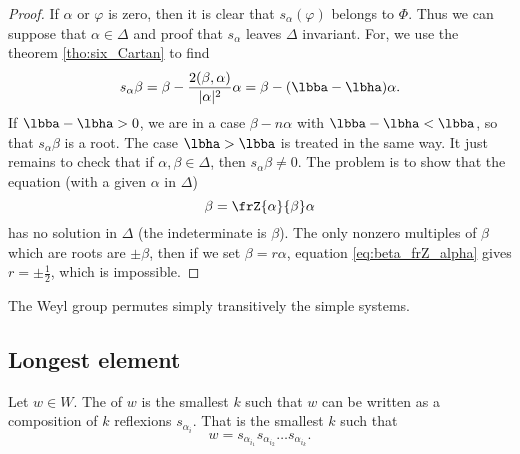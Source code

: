 \begin{proof}
If $\alpha$ or $\varphi$ is zero, then it is clear that $s_{\alpha}(\varphi)$ belongs to $\Phi$. Thus we can suppose that $\alpha\in\Delta$ and proof that $s_{\alpha}$ leaves $\Delta$ invariant. For, we use the theorem \ref{tho:six_Cartan} to find
\begin{equation}
  s_{\alpha}\beta=\beta-\frac{2(\beta,\alpha)}{|\alpha|^2}\alpha
               =\beta-(\lbba-\lbha)\alpha.
\end{equation}
If $\lbba-\lbha>0$, we are in a case $\beta-n\alpha$ with $\lbba-\lbha<\lbba$, so that $s_{\alpha}\beta$ is a root. The case $\lbha>\lbba$ is treated in the same way. It just remains to check that  if $\alpha,\beta\in\Delta$, then $s_{\alpha}\beta\neq0$. The problem is to show that the equation (with a given $\alpha$ in $\Delta$)
\begin{equation}\label{eq:beta_frZ_alpha}
   \beta=\frZ{\alpha}{\beta}\alpha
\end{equation}
has no solution in $\Delta$ (the indeterminate is $\beta$). The only nonzero multiples of $\beta$ which are roots are $\pm\beta$, then if we set $\beta=r\alpha$, equation \eqref{eq:beta_frZ_alpha} gives $r=\pm\frac{1}{2}$, which is impossible.

\end{proof}

\begin{proposition}
    The Weyl group permutes simply transitively the simple systems.
\end{proposition}



\subsection{Longest element}

Let \( w\in W\). The  of \( w\) is the smallest \( k\) such that \( w\) can be written as a composition of \( k\) reflexions \( s_{\alpha_i}\). That is the smallest \( k\) such that
\begin{equation}
    w=s_{\alpha_{i_1}}s_{\alpha_{i_2}}\ldots s_{\alpha_{i_k}}.
\end{equation}

